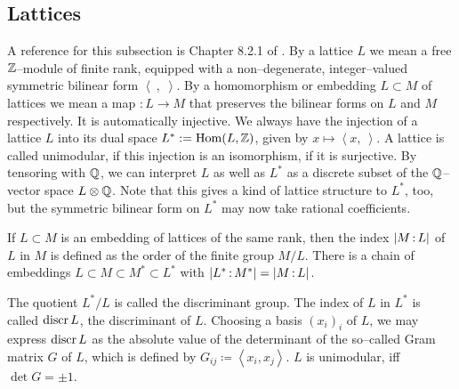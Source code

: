 \subsection{Lattices}\label{latticeSubsection}A reference for this subsection is Chapter 8.2.1 of \cite{Dolgachev}. By a lattice $L$ we mean a free $\mathbb{Z}$--module of finite rank, equipped with a non--degenerate, integer--valued symmetric bilinear form $\left<\ ,\;\right>$. By a homomorphism or embedding $L\subset M$ of lattices we mean a map $:L\rightarrow M$ that preserves the bilinear forms on $L$ and $M$ respectively. It is automatically injective. We always have the injection of a lattice $L$ into its dual space $L^*:= \operatorname{Hom}(L,\mathbb{Z})$, given by $x \mapsto \left<x,\ \right>$. A lattice is called unimodular, if this injection is an isomorphism, \ie if it is surjective. By tensoring with $\mathbb{Q}$, we can interpret $L$ as well as $L^*$ as a discrete subset of the $\mathbb{Q}$--vector space $L\otimes \mathbb{Q}$. Note that this gives a kind of lattice structure to $L^*$, too, but the symmetric bilinear form on $L^*$ may now take rational coefficients.

If $L\subset M$ is an embedding of lattices of the same rank, then the index $|M\,{:}\, L|$ of $L$ in $M$ is defined as the order of the finite group $M/L$.
There is a chain of embeddings $L\subset M \subset M^* \subset L^*$ with $|L^*\,{:}\, M^*| =|M\,{:}\, L| $.

The quotient $L^*/L$ is called the discriminant group. The index of $L$ in $L^*$ is called $\operatorname{discr} L$, the discriminant of $L$.
Choosing a basis $(x_i)_i$ of $L$, we may express $\operatorname{discr} L$ as the absolute value of the determinant of the so--called Gram matrix $G$ of $L$, which is defined by $G_{ij}\coloneqq \left<x_i,x_j\right>$. $L$ is unimodular, iff $\det G =\pm 1$.


